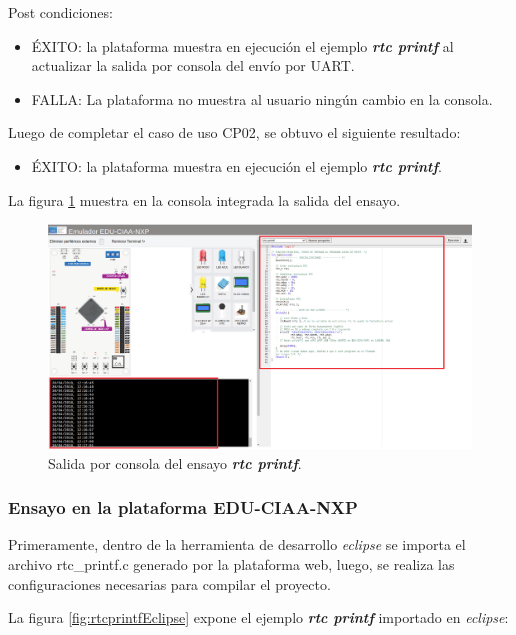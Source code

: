 Post condiciones:
\begin{itemize}
	\item ÉXITO: la plataforma muestra en ejecución el ejemplo \textit{\textbf{rtc printf}} al actualizar la salida por consola del envío por UART.
	\item FALLA: La plataforma no muestra al usuario ningún cambio en la consola.
\end{itemize}


Luego de completar el caso de uso CP02, se obtuvo el siguiente resultado: 

\begin{itemize}
	\item ÉXITO: la plataforma muestra en ejecución el ejemplo \textit{\textbf{rtc printf}}.
\end{itemize}


La figura \ref{fig:rtcprintf} muestra en la consola integrada la salida del ensayo. 

\begin{figure}[ht]
	\centering
	\includegraphics[scale=.21]{./Figures/rtcprintf.png}
	\caption{Salida por consola del ensayo \textit{\textbf{rtc printf}}.}
	\label{fig:rtcprintf}
\end{figure}

\subsubsection{Ensayo en la plataforma EDU-CIAA-NXP} 

Primeramente, dentro de la herramienta de desarrollo \textit{eclipse} se importa el archivo \textquotedbl rtc\_printf.c\textquotedbl{} generado por la plataforma web, luego, se realiza las configuraciones necesarias para compilar el proyecto. 

La figura \ref{fig:rtcprintfEclipse} expone el ejemplo \textit{\textbf{rtc printf}} importado en \textit{eclipse}: 

